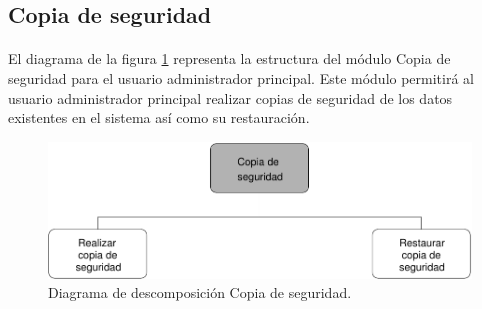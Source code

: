 \subsection{Copia de seguridad}

  \paragraph{}El diagrama de la figura
  \ref{diagramaDescomposicionCopiaSeguridad} representa la estructura del
  módulo Copia de seguridad para el usuario administrador principal.
  Este módulo permitirá al usuario administrador principal realizar copias de
  seguridad de los datos existentes en el sistema así como su restauración.

  \begin{figure}[!ht]
    \begin{center}
      \includegraphics[]{11.Disenyo_Arquitectonico/11.2.Diagramas_Descomposicion/11.2.2.Modulo_administrador_principal/CopiaSeguridad/Diagramas/copia_seguridad.pdf}
      \caption{Diagrama de descomposición Copia de seguridad.}
      \label{diagramaDescomposicionCopiaSeguridad}
    \end{center}
  \end{figure}